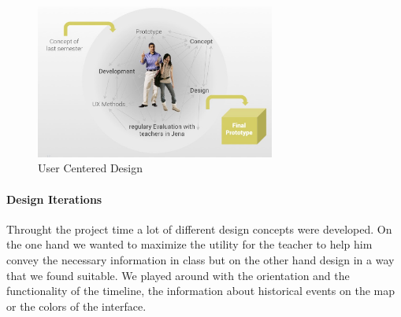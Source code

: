 \begin{figure}[H]
  \centering
  \includegraphics[width=0.7\textwidth]{graphics/design-1.jpg}
  \caption{User Centered Design}
\end{figure}

\paragraph{Design Iterations}
Throught the project time a lot of different design concepts were developed. On the one hand we wanted to maximize the utility for the teacher to help him convey the necessary information in class but on the other hand design \HG in a way that we found suitable. We played around with the orientation and the functionality of the timeline, the information about historical events on the map or the colors of the interface.

